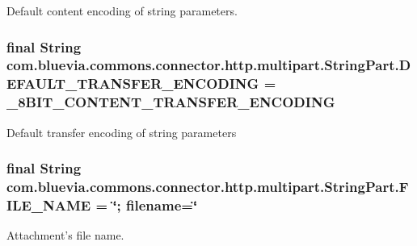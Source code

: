 Default content encoding of string parameters. \hypertarget{classcom_1_1bluevia_1_1commons_1_1connector_1_1http_1_1multipart_1_1StringPart_a02fd67cc9c716ff16f09275b087205c3}{
\subsubsection[{DEFAULT\_\-TRANSFER\_\-ENCODING}]{\setlength{\rightskip}{0pt plus 5cm}final String {\bf com.bluevia.commons.connector.http.multipart.StringPart.DEFAULT\_\-TRANSFER\_\-ENCODING} = \_\-8BIT\_\-CONTENT\_\-TRANSFER\_\-ENCODING}}
\label{classcom_1_1bluevia_1_1commons_1_1connector_1_1http_1_1multipart_1_1StringPart_a02fd67cc9c716ff16f09275b087205c3}
Default transfer encoding of string parameters \hypertarget{classcom_1_1bluevia_1_1commons_1_1connector_1_1http_1_1multipart_1_1StringPart_a75442e4228ebe966e5279c71f28fb11e}{
\subsubsection[{FILE\_\-NAME}]{\setlength{\rightskip}{0pt plus 5cm}final String {\bf com.bluevia.commons.connector.http.multipart.StringPart.FILE\_\-NAME} = \char`\"{}; filename=\char`\"{}}}
\label{classcom_1_1bluevia_1_1commons_1_1connector_1_1http_1_1multipart_1_1StringPart_a75442e4228ebe966e5279c71f28fb11e}
Attachment's file name. 